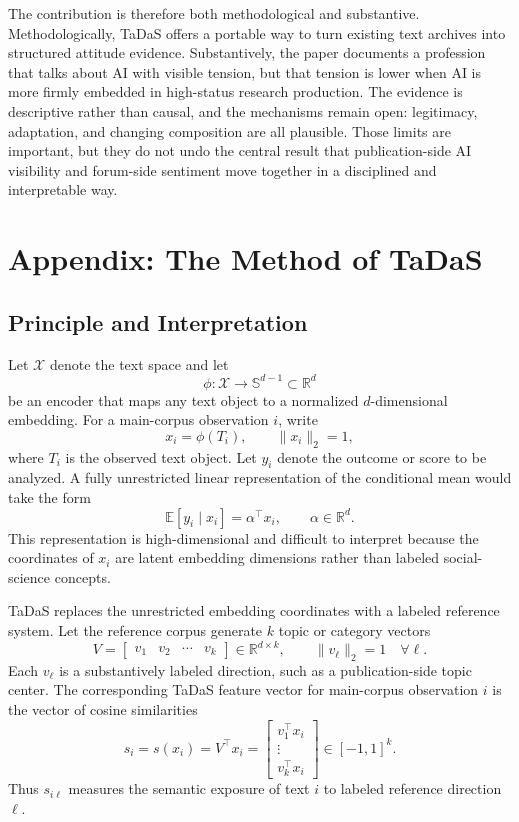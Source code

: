 \documentclass[11pt]{article}
\begin{document}
The contribution is therefore both methodological and substantive. Methodologically, TaDaS offers a portable way to turn existing text archives into structured attitude evidence. Substantively, the paper documents a profession that talks about AI with visible tension, but that tension is lower when AI is more firmly embedded in high-status research production. The evidence is descriptive rather than causal, and the mechanisms remain open: legitimacy, adaptation, and changing composition are all plausible. Those limits are important, but they do not undo the central result that publication-side AI visibility and forum-side sentiment move together in a disciplined and interpretable way.


\clearpage
\appendix

\section{Appendix: The Method of TaDaS}
\label{app:tadas_method}

\subsection{Principle and Interpretation}

Let $\mathcal{X}$ denote the text space and let
\[
\phi:\mathcal{X}\rightarrow\mathbb{S}^{d-1}\subset\mathbb{R}^d
\]
be an encoder that maps any text object to a normalized $d$-dimensional embedding. For a main-corpus observation $i$, write
\[
x_i=\phi(T_i), \qquad \|x_i\|_2=1,
\]
where $T_i$ is the observed text object. Let $y_i$ denote the outcome or score to be analyzed. A fully unrestricted linear representation of the conditional mean would take the form
\[
\mathbb{E}[y_i\mid x_i]=\alpha^\top x_i,
\qquad
\alpha\in\mathbb{R}^d .
\]
This representation is high-dimensional and difficult to interpret because the coordinates of $x_i$ are latent embedding dimensions rather than labeled social-science concepts.

TaDaS replaces the unrestricted embedding coordinates with a labeled reference system. Let the reference corpus generate $k$ topic or category vectors
\[
V=\begin{bmatrix}v_1&v_2&\cdots&v_k\end{bmatrix}\in\mathbb{R}^{d\times k},
\qquad
\|v_\ell\|_2=1 \quad \forall \ell .
\]
Each $v_\ell$ is a substantively labeled direction, such as a publication-side topic center. The corresponding TaDaS feature vector for main-corpus observation $i$ is the vector of cosine similarities
\[
s_i=s(x_i)=V^\top x_i
=
\begin{bmatrix}
v_1^\top x_i\\
\vdots\\
v_k^\top x_i
\end{bmatrix}
\in[-1,1]^k .
\]
Thus $s_{i\ell}$ measures the semantic exposure of text $i$ to labeled reference direction $\ell$.
\end{document}
